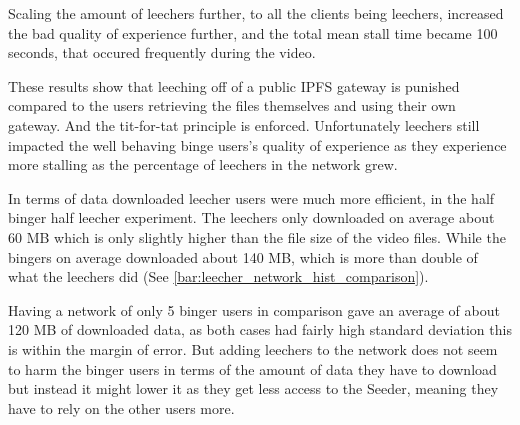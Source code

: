




%

Scaling the amount of leechers further, to all the clients being leechers, increased the bad quality of experience further, and the total mean stall time became 100 seconds, that occured frequently during the video.

These results show that leeching off of a public \ac{IPFS} gateway is punished compared to the users retrieving the files themselves and using their own gateway. And the tit-for-tat principle is enforced. Unfortunately leechers still impacted the well behaving binge users's quality of experience as they experience more stalling as the percentage of leechers in the network grew.

In terms of data downloaded leecher users were much more efficient, in the half binger half leecher experiment. The leechers only downloaded on average about 60 \ac{MB} which is only slightly higher than the file size of the video files. While the bingers on average downloaded about 140 \ac{MB}, which is more than double of what the leechers did (See \autoref{bar:leecher_network_hist_comparison}). 


Having a network of only 5 binger users in comparison gave an average of about 120 \ac{MB} of downloaded data, as both cases had fairly high standard deviation this is within the margin of error. But adding leechers to the network does not seem to harm the binger users in terms of the amount of data they have to download but instead it might lower it as they get less access to the Seeder, meaning they have to rely on the other users more.

